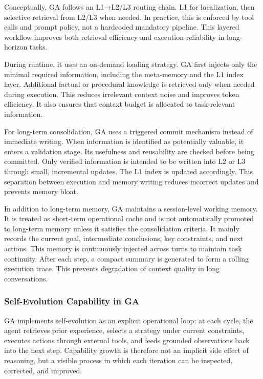 Conceptually, GA follows an L1→L2/L3 routing chain. L1 for localization, then selective retrieval from L2/L3 when needed. In practice, this is enforced by tool calls and prompt policy, not a hardcoded mandatory pipeline.
This layered workflow improves both retrieval efficiency and execution reliability in long-horizon tasks.

During runtime, it uses an on-demand loading strategy. 
GA first injects only the minimal required information, including the meta-memory and the L1 index layer.
Additional factual or procedural knowledge is retrieved only when needed during execution.
This reduces irrelevant context noise and improves token efficiency.
It also ensures that context budget is allocated to task-relevant information.

For long-term consolidation, GA uses a triggered commit mechanism instead of immediate writing.
When information is identified as potentially valuable, it enters a validation stage.
Its usefulness and reusability are checked before being committed.
Only verified information is intended to be written into L2 or L3 through small, incremental updates.
The L1 index is updated accordingly. This separation between execution and memory writing reduces incorrect updates and prevents memory bloat.

In addition to long-term memory, GA maintains a session-level working memory.
It is treated as short-term operational cache and is not automatically promoted to long-term memory unless it satisfies the consolidation criteria.
It mainly records the current goal, intermediate conclusions, key constraints, and next actions.
This memory is continuously injected across turns to maintain task continuity.
After each step, a compact summary is generated to form a rolling execution trace.
This prevents degradation of context quality in long conversations.


\subsubsection{Self-Evolution Capability in GA}
\label{sec:self-evolution}
GA implements self-evolution as an explicit operational loop: at each cycle, the agent retrieves prior experience, selects a strategy under current constraints, executes actions through external tools, and feeds grounded observations back into the next step. Capability growth is therefore not an implicit side effect of reasoning, but a visible process in which each iteration can be inspected, corrected, and improved.

